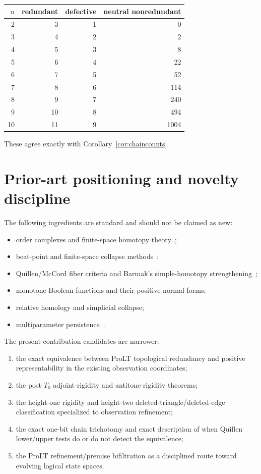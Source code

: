 \documentclass[11pt]{article}
\theoremstyle{definition}
\begin{document}
\begin{center}
\begin{tabular}{r|r|r|r}
\toprule
$n$ & redundant & defective & neutral nonredundant \\
\midrule
2&3&1&0\\
3&4&2&2\\
4&5&3&8\\
5&6&4&22\\
6&7&5&52\\
7&8&6&114\\
8&9&7&240\\
9&10&8&494\\
10&11&9&1004\\
\bottomrule
\end{tabular}
\end{center}

These agree exactly with Corollary~\ref{cor:chaincounts}.

\section{Prior-art positioning and novelty discipline}

The following ingredients are standard and should not be claimed as new:
\begin{itemize}
\item order complexes and finite-space homotopy theory~\cite{McCord1966,Stong1966};
\item beat-point and finite-space collapse methods~\cite{BarmakMinian2008};
\item Quillen/McCord fiber criteria and Barmak's simple-homotopy strengthening~\cite{Barmak2010};
\item monotone Boolean functions and their positive normal forms;
\item relative homology and simplicial collapse;
\item multiparameter persistence~\cite{CarlssonZomorodian2009,BotnanLesnick2022}.
\end{itemize}

The present contribution candidates are narrower:
\begin{enumerate}[label=(\alph*)]
\item the exact equivalence between ProLT topological redundancy and positive representability in the existing observation coordinates;
\item the post-$T_0$ adjoint-rigidity and antitone-rigidity theorems;
\item the height-one rigidity and height-two deleted-triangle/deleted-edge classification specialized to observation refinement;
\item the exact one-bit chain trichotomy and exact description of when Quillen lower/upper tests do or do not detect the equivalence;
\item the ProLT refinement/premise bifiltration as a disciplined route toward evolving logical state spaces.
\end{enumerate}
\end{document}
